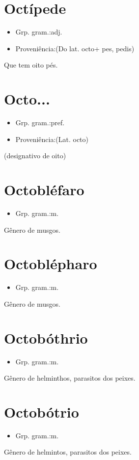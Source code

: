 \section{Octípede}
\begin{itemize}
\item {Grp. gram.:adj.}
\end{itemize}
\begin{itemize}
\item {Proveniência:(Do lat. \textunderscore octo\textunderscore  + \textunderscore pes\textunderscore , \textunderscore pedis\textunderscore )}
\end{itemize}
Que tem oito pés.
\section{Octo...}
\begin{itemize}
\item {Grp. gram.:pref.}
\end{itemize}
\begin{itemize}
\item {Proveniência:(Lat. \textunderscore octo\textunderscore )}
\end{itemize}
(designativo de \textunderscore oito\textunderscore )
\section{Octobléfaro}
\begin{itemize}
\item {Grp. gram.:m.}
\end{itemize}
Gênero de musgos.
\section{Octoblépharo}
\begin{itemize}
\item {Grp. gram.:m.}
\end{itemize}
Gênero de musgos.
\section{Octobóthrio}
\begin{itemize}
\item {Grp. gram.:m.}
\end{itemize}
Gênero de helminthos, parasitos dos peixes.
\section{Octobótrio}
\begin{itemize}
\item {Grp. gram.:m.}
\end{itemize}
Gênero de helmintos, parasitos dos peixes.
